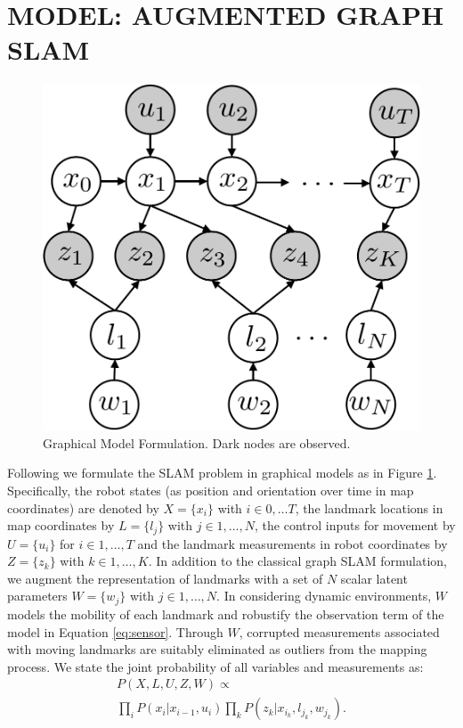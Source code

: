 \section{MODEL: AUGMENTED GRAPH SLAM}
\label{sec:model}
\begin{figure}[!t]
\begin{center}
 \includegraphics[width=0.5\columnwidth]{fig/model} 
\end{center}
\caption{Graphical Model Formulation. Dark nodes are observed.}
\label{fig:model}
\end{figure}

Following \cite{isam} we formulate the SLAM problem in graphical models as in Figure \ref{fig:model}. Specifically, the robot states (as position and orientation over time in map coordinates) are denoted by $X = \{x_i\}$ with $i \in 0, \dots T$, the landmark locations in map coordinates by $L = \{l_j\}$ with $j \in 1,\dots, N$, the control inputs for movement by $U = \{u_i\}$ for $i \in 1,\dots, T$ and the landmark measurements in robot coordinates by $Z = \{z_k\}$ with $k \in 1, \dots, K$. In addition to the classical graph SLAM formulation, we augment the representation of landmarks with a set of $N$ scalar latent parameters $W = \{w_j\}$ with $j \in 1, \dots, N$.
In considering dynamic environments, $W$ models the mobility of each landmark and robustify the observation term of the model in Equation \ref{eq:sensor}.  Through $W$, corrupted measurements associated with moving landmarks are suitably eliminated as outliers from the mapping process. We state the joint probability of all variables and measurements as:
\begin{multline}
P(X, L, U, Z, W) \propto  \\
\prod\limits_{i}P(x_i|x_{i-1}, u_i)\prod\limits_{k}P(z_k|x_{i_k}, l_{j_k}, w_{j_k}).
\label{eq:jointProb}
\end{multline}

